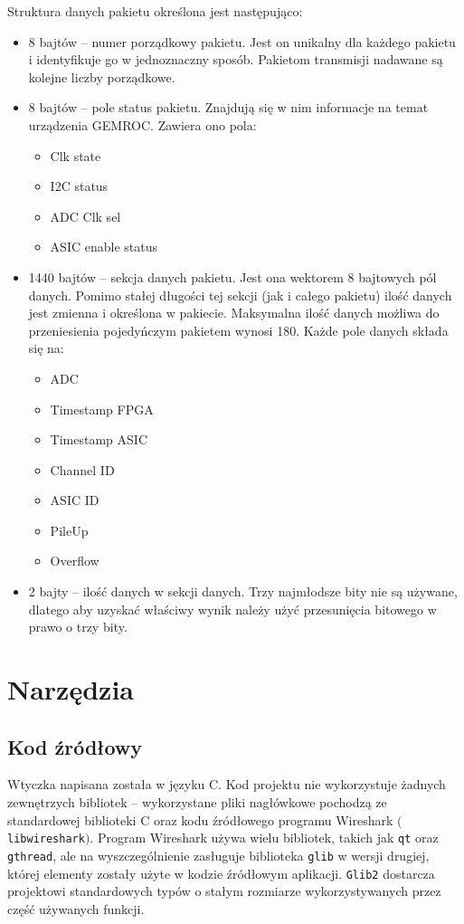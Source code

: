\documentclass[a4paper, 12pt, twoside, openright]{article}
\begin{document}
	Struktura danych pakietu określona jest następująco:
	\begin{itemize}
		\item 8 bajtów -- numer porządkowy pakietu. Jest on unikalny dla każdego pakietu i identyfikuje go w jednoznaczny sposób.
			Pakietom transmisji nadawane są kolejne liczby porządkowe.
		\item 8 bajtów -- pole status pakietu. Znajdują się w nim informacje na temat urządzenia GEMROC. Zawiera ono pola:
			\begin{itemize}
				\item Clk state
				\item I2C status
				\item ADC Clk sel
				\item ASIC enable status
			\end{itemize}
		\item 1440 bajtów -- sekcja danych pakietu. Jest ona wektorem 8 bajtowych pól danych. Pomimo stałej długości tej sekcji
			(jak i całego pakietu) ilość danych jest zmienna i określona w pakiecie. Maksymalna ilość danych możliwa do przeniesienia
			pojedyńczym pakietem wynosi 180. Każde pole danych składa się na:
			\begin{itemize}
				\item ADC
				\item Timestamp FPGA
				\item Timestamp ASIC
				\item Channel ID
				\item ASIC ID
				\item PileUp
				\item Overflow
			\end{itemize}
		\item 2 bajty -- ilość danych w sekcji danych. Trzy najmłodsze bity nie są używane, dlatego aby uzyskać właściwy wynik
			należy użyć przesunięcia bitowego w prawo o trzy bity.
	\end{itemize}



\newpage
\section{Narzędzia}
\subsection{Kod źródłowy}

	\indent\par
	Wtyczka napisana została w języku C. Kod projektu nie wykorzystuje żadnych zewnętrzych bibliotek -- wykorzystane pliki nagłówkowe
	pochodzą ze standardowej biblioteki C oraz kodu źródłowego programu Wireshark $($\texttt{libwireshark}$)$.
	Program Wireshark używa wielu bibliotek, takich jak \texttt{qt} oraz \texttt{gthread}, ale na wyszczególnienie zasługuje biblioteka
	\texttt{glib} w wersji drugiej, której
	elementy zostały użyte w kodzie źródłowym aplikacji. \texttt{Glib2} dostarcza projektowi standardowych typów o stałym
	rozmiarze wykorzystywanych przez część używanych funkcji.
\end{document}
